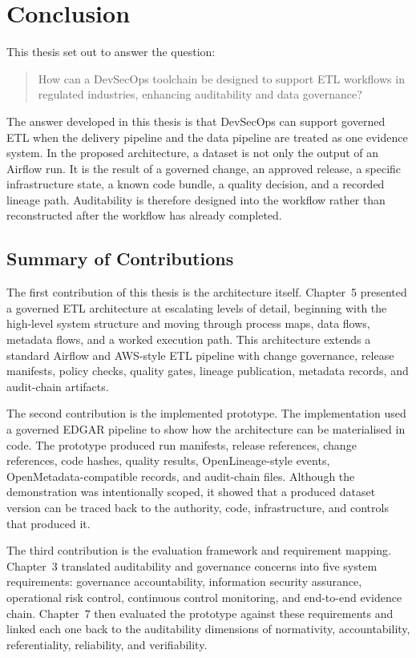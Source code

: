 \chapter{Conclusion}
\noindent
This thesis set out to answer the question:

\begin{quote}
How can a DevSecOps toolchain be designed to support ETL workflows in regulated
industries, enhancing auditability and data governance?
\end{quote}

The answer developed in this thesis is that DevSecOps can support governed ETL
when the delivery pipeline and the data pipeline are treated as one evidence
system. In the proposed architecture, a dataset is not only the output of an
Airflow run. It is the result of a governed change, an approved release, a
specific infrastructure state, a known code bundle, a quality decision, and a
recorded lineage path. Auditability is therefore designed into the workflow
rather than reconstructed after the workflow has already completed.

\section{Summary of Contributions}
\noindent
The first contribution of this thesis is the architecture itself. Chapter~5
presented a governed ETL architecture at escalating levels of detail, beginning
with the high-level system structure and moving through process maps, data
flows, metadata flows, and a worked execution path. This architecture extends a
standard Airflow and AWS-style ETL pipeline with change governance, release
manifests, policy checks, quality gates, lineage publication, metadata
records, and audit-chain artifacts.

The second contribution is the implemented prototype. The implementation used a
governed EDGAR pipeline to show how the architecture can be materialised in
code. The prototype produced run manifests, release references, change
references, code hashes, quality results, OpenLineage-style events,
OpenMetadata-compatible records, and audit-chain files. Although the
demonstration was intentionally scoped, it showed that a produced dataset
version can be traced back to the authority, code, infrastructure, and controls
that produced it.

The third contribution is the evaluation framework and requirement mapping.
Chapter~3 translated auditability and governance concerns into five system
requirements: governance accountability, information security assurance,
operational risk control, continuous control monitoring, and end-to-end
evidence chain. Chapter~7 then evaluated the prototype against these
requirements and linked each one back to the auditability dimensions of
normativity, accountability, referentiality, reliability, and verifiability.

